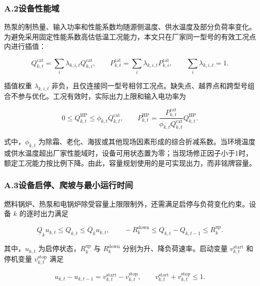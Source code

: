 \subsubsection*{A.2\quad 设备性能域}

热泵的制热量、输入功率和性能系数均随源侧温度、供水温度及部分负荷率变化。为避免采用固定性能系数高估低温工况能力，本文只在厂家同一型号的有效工况点内进行插值：

\begin{equation}
Q_{k,t}^{\mathrm{cat}}=\sum_i\lambda_{k,i,t}Q_{k,i}^{\mathrm{cat}},
\qquad
P_{k,t}^{\mathrm{cat}}=\sum_i\lambda_{k,i,t}P_{k,i}^{\mathrm{cat}},
\qquad
\sum_i\lambda_{k,i,t}=1.
\label{eq:performance_interpolation}
\end{equation}

插值权重 $\lambda_{k,i,t}$ 非负，且仅连接同一型号相邻工况点。缺失点、越界点和跨型号组合不参与优化。工况有效时，实际出力上限和输入电功率为

\begin{equation}
0\leq Q_{k,t}^{\mathrm{HP}}\leq\phi_{k,t}Q_{k,t}^{\mathrm{cat}},
\qquad
P_{k,t}^{\mathrm{HP}}
=\frac{P_{k,t}^{\mathrm{cat}}}{\phi_{k,t}Q_{k,t}^{\mathrm{cat}}}Q_{k,t}^{\mathrm{HP}}.
\label{eq:performance_limit}
\end{equation}

式中，$\phi_{k,t}$ 为除霜、老化、海拔或其他现场因素形成的综合折减系数。当环境温度或供水温度超出厂家性能域时，设备可用状态置为零；当现场修正因子小于1时，额定工况能力按比例下降。由此，容量规划使用的是可实现出力，而非铭牌容量。

\subsubsection*{A.3\quad 设备启停、爬坡与最小运行时间}

燃料锅炉、热泵和电锅炉除受容量上限限制外，还需满足启停与负荷变化约束。设备 $k$ 的逐时出力满足

\begin{equation}
\underline Q_ku_{k,t}\leq Q_{k,t}\leq \overline Q_ku_{k,t},
\qquad
-R_k^{\mathrm{down}}\leq Q_{k,t}-Q_{k,t-1}\leq R_k^{\mathrm{up}}.
\label{eq:ramp_limit}
\end{equation}

其中，$u_{k,t}$ 为启停状态，$R_k^{\mathrm{up}}$ 与 $R_k^{\mathrm{down}}$ 分别为升、降负荷速率。启动变量 $v_{k,t}^{\mathrm{start}}$ 和停机变量 $v_{k,t}^{\mathrm{stop}}$ 满足

\begin{equation}
u_{k,t}-u_{k,t-1}=v_{k,t}^{\mathrm{start}}-v_{k,t}^{\mathrm{stop}},
\qquad
v_{k,t}^{\mathrm{start}}+v_{k,t}^{\mathrm{stop}}\leq1.
\label{eq:startup_logic}
\end{equation}

